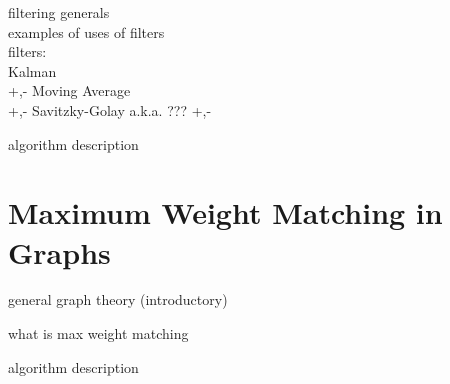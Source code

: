 filtering generals\\
examples of uses of filters\\
filters:\\
	Kalman\\
		+,-
	Moving Average\\
		+,-
	Savitzky-Golay a.k.a. ???
		+,-

algorithm description

\section{Maximum Weight Matching in Graphs} \label{sec:theorBack-MWMGraphs}

general graph theory (introductory)

what is max weight matching

algorithm description
